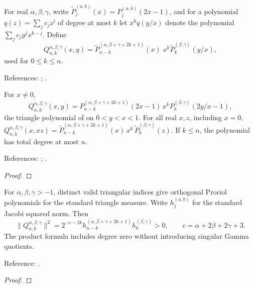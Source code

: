 \begin{definition}
\label{def:proriol-triangle}
\leanok
For real $\alpha,\beta,\gamma$, write $\widetilde P_j^{(a,b)}(x)=P_j^{(a,b)}(2x-1)$,
and for a polynomial $q(z)=\sum_j c_jz^j$ of degree at most $k$ let
$x^kq(y/x)$ denote the polynomial $\sum_j c_jy^jx^{k-j}$. Define
\[
 Q_{n,k}^{\alpha,\beta,\gamma}(x,y)=
 \widetilde P_{n-k}^{(\alpha,\beta+\gamma+2k+1)}(x)\;
 x^k\widetilde P_k^{(\beta,\gamma)}(y/x),
\]
used for $0\le k\le n$.

References: \cite[18.37.7]{dlmf}; \cite[Section 2.4]{dunkl-xu}.
\end{definition}

\begin{theorem}
\label{thm:proriol-triangle-basic}
\leanok
For $x\ne0$,
\[
 Q_{n,k}^{\alpha,\beta,\gamma}(x,y)=
 P_{n-k}^{(\alpha,\beta+\gamma+2k+1)}(2x-1)\,x^kP_k^{(\beta,\gamma)}(2y/x-1),
\]
the triangle polynomial of \cite[18.37.7]{dlmf} on $0<y<x<1$. For all real
$x,z$, including $x=0$,
$Q_{n,k}^{\alpha,\beta,\gamma}(x,xz)=\widetilde P_{n-k}^{(\alpha,\beta+\gamma+2k+1)}(x)\,
x^k\,\widetilde P_k^{(\beta,\gamma)}(z)$. If $k\le n$, the polynomial has total
degree at most $n$.

References: \cite[18.37.7]{dlmf}; \cite[Section 2.4]{dunkl-xu}.
\end{theorem}
\begin{proof}
\leanok
\end{proof}

\begin{theorem}
\label{thm:proriol-triangle-orthogonality}
\leanok
For $\alpha,\beta,\gamma>-1$, distinct valid triangular indices give orthogonal
Proriol polynomials for the standard triangle measure. Write $h_j^{(a,b)}$
for the standard Jacobi squared norm. Then
\[
 \|Q_{n,k}^{\alpha,\beta,\gamma}\|^2
 =2^{-c-2k}h_{n-k}^{(\alpha,\beta+\gamma+2k+1)}h_k^{(\beta,\gamma)}>0,
 \qquad c=\alpha+2\beta+2\gamma+3.
\]
The product formula includes degree zero without introducing singular Gamma quotients.

Reference: \cite[18.37.8]{dlmf}.
\end{theorem}
\begin{proof}
\leanok
\end{proof}

